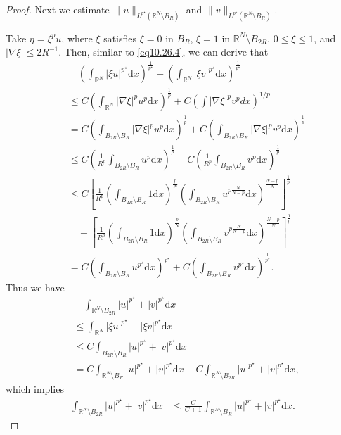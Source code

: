 \documentclass[12pt]{amsart}
\theoremstyle{definition}
\theoremstyle{remark}
\theoremstyle{conclusion}
\theoremstyle{conjecture}
\numberwithin{equation}{section}
\newcommand{\R}{\mathbb{R}}
\begin{document}
\begin{proof}
\smallskip

Next we estimate $\| u \|_{L^{p^{\star}}(\R^N \setminus B_{R})}$ and $\| v\|_{L^{p^{\star}}(\R^N \setminus B_{R})}$.

Take $\eta=\xi^p u$, where $\xi$ satisfies $\xi=0$ in $B_R$, $\xi=1$ in $\R^N \setminus B_{2R}$, $0\leq \xi\leq 1$, and $|\nabla \xi| \leq 2R^{-1}$. Then, similar to \eqref{eq10.26.4}, we can derive that
\begin{align}\label{eq10.26.9}
&\quad \left(\int_{\R^N } |\xi u|^{p^{\star}} \mathrm{d}x \right)^\frac{1}{p^{\star}}+\left(\int_{\R^N } |\xi v|^{p^{\star}} \mathrm{d}x \right)^\frac{1}{p^{\star}} \\
&\leq C  \left( \int_{\R^N} |\nabla \xi|^p u^{p} \mathrm{d}x \right)^\frac{1}{p}+ C \left( \int |\nabla \xi|^p  v^p dx \right)^{1/p} \nonumber \\
&= C \left( \int_{B_{2R}\setminus B_R} |\nabla \xi|^p u^{p} \mathrm{d}x \right)^\frac{1}{p}+C \left( \int_{B_{2R}\setminus B_R} |\nabla \xi|^p v^{p} \mathrm{d}x \right)^\frac{1}{p} \nonumber \\
& \leq C \left( \frac{1}{R^p} \int_{B_{2R}\setminus B_R} u^{p} \mathrm{d}x \right)^\frac{1}{p}+C \left( \frac{1}{R^p} \int_{B_{2R}\setminus B_R} v^{p} \mathrm{d}x \right)^\frac{1}{p} \nonumber\\
& \leq C \left[\frac{1}{R^p}\left(\int_{B_{2R}\setminus B_R} 1 \mathrm{d}x\right)^\frac{p}{N}\left(\int_{B_{2R}\setminus B_R} u^{p\frac{N}{N-p}} \mathrm{d}x\right)^\frac{N-p}{N} \right]^\frac{1}{p} \nonumber\\
& \quad+\left[\frac{1}{R^p}\left(\int_{B_{2R}\setminus B_R} 1 \mathrm{d}x\right)^\frac{p}{N}\left(\int_{B_{2R}\setminus B_R} v^{p\frac{N}{N-p}} \mathrm{d}x\right)^\frac{N-p}{N} \right]^\frac{1}{p} \nonumber\\
&=C \left(\int_{B_{2R}\setminus B_R} u^{p^{\star}} \mathrm{d}x \right)^\frac{1}{p^{\star}}+C \left(\int_{B_{2R}\setminus B_R} v^{p^{\star}} \mathrm{d}x \right)^\frac{1}{p^{\star}}. \nonumber
\end{align}
Thus we have
\begin{align}\label{eq10.26.10}
&\quad \int_{\R^N \setminus B_{2R}} |u|^{p^{\star}} + |v|^{p^{\star}} \mathrm{d}x \\
&\leq \int_{\R^N } |\xi u|^{p^{\star}}+|\xi v|^{p^{\star}} \mathrm{d}x \nonumber \\
&\leq C \int_{B_{2R}\setminus B_R} |u|^{p^{\star}}+|v|^{p^{\star}} \mathrm{d}x \nonumber \\
&= C \int_{\R^N \setminus B_R} |u|^{p^{\star}}+|v|^{p^{\star}} \mathrm{d}x - C \int_{\R^N \setminus B_{2R}} |u|^{p^{\star}}+|v|^{p^{\star}} \mathrm{d}x, \nonumber
\end{align}
which implies
\begin{align}\label{eq10.26.11}
\int_{\R^N \setminus B_{2R}} |u|^{p^{\star}}+|v|^{p^{\star}} \mathrm{d}x
&\leq  \frac{C}{C+1} \int_{\R^N \setminus B_R} |u|^{p^{\star}}+|v|^{p^{\star}} \mathrm{d}x.
\end{align}


\end{proof}
\end{document}
